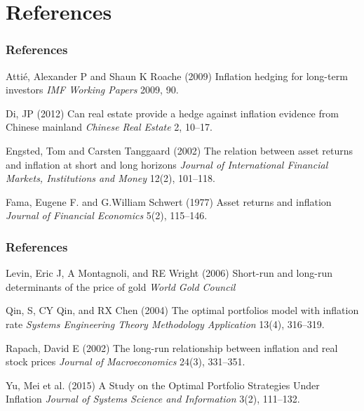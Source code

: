 \documentclass[
	11pt, %
]{beamer}
\begin{document}
\section{References}
\begin{frame} %
\frametitle{References}

\begin{thebibliography}{99} %
\footnotesize %

Attié, Alexander P and Shaun K Roache (2009)
\newblock Inflation hedging for long-term investors
\newblock \emph{IMF Working Papers} 2009, 90.

Di, JP (2012)
\newblock Can real estate provide a hedge against inflation evidence from Chinese mainland
\newblock \emph{Chinese Real Estate} 2, 10–17.

Engsted, Tom and Carsten Tanggaard (2002)
\newblock The relation between asset returns and inflation at short and long horizons
\newblock \emph{Journal of International Financial Markets, Institutions and Money} 12(2), 101–118.

Fama, Eugene F. and G.William Schwert (1977)
\newblock Asset returns and inflation
\newblock \emph{Journal of Financial Economics} 5(2), 115–146.

\end{thebibliography}
\end{frame}
\begin{frame} %
\frametitle{References}

\begin{thebibliography}{99} %
\footnotesize %

Levin, Eric J, A Montagnoli, and RE Wright (2006)
\newblock Short-run and long-run determinants of the price of gold
\newblock \emph{World Gold Council}

Qin, S, CY Qin, and RX Chen (2004)
\newblock The optimal portfolios model with inflation rate
\newblock \emph{Systems Engineering Theory Methodology Application} 13(4), 316–319.

Rapach, David E (2002)
\newblock The long-run relationship between inflation and real stock prices
\newblock \emph{Journal of Macroeconomics} 24(3), 331–351.

Yu, Mei et al. (2015)
\newblock A Study on the Optimal Portfolio Strategies Under Inflation
\newblock \emph{Journal of Systems Science and Information} 3(2), 111–132.

\end{thebibliography}
\end{frame}
\end{document}
